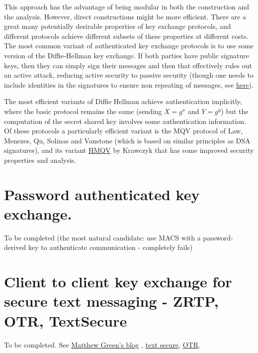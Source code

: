 This approach has the advantage of being modular in both the
construction and the analysis. However, direct constructions might be
more efficient. There are a great many potentially desirable properties
of key exchange protocols, and different protocols achieve different
subsets of these properties at different costs. The most common variant
of authenticated key exchange protocols is to use some version of the
Diffie-Hellman key exchange. If both parties have public signature keys,
then they can simply sign their messages and then that effectively rules
out an active attack, reducing active security to passive security
(though one needs to include identities in the signatures to ensure non
repeating of messages, see
\href{http://link.springer.com/article/10.1007\%2FBF00124891}{here}).

The most efficient variants of Diffie Hellman achieve authentication
implicitly, where the basic protocol remains the same (sending \(X=g^x\)
and \(Y=g^y\)) but the computation of the secret shared key involves
some authentication information. Of these protocols a particularly
efficient variant is the MQV protocol of Law, Menezes, Qu, Solinas and
Vanstone (which is based on similar principles as DSA signatures), and
its variant \href{https://eprint.iacr.org/2005/176.pdf}{HMQV} by
Krawczyk that has some improved security properties and analysis.

\section{Password authenticated key
exchange.}\label{Password-authenticated-ke}

To be completed (the most natural candidate: use MACS with a
password-derived key to authenticate communication - completely fails)


\section{Client to client key exchange for secure text messaging - ZRTP,
OTR, TextSecure}\label{Client-to-client-key-exch}

To be completed. See
\href{http://blog.cryptographyengineering.com/2013/03/here-come-encryption-apps.html}{Matthew
Green's blog} ,
\href{https://whispersystems.org/blog/advanced-ratcheting/}{text
secure}, \href{https://otr.cypherpunks.ca/Protocol-v3-4.0.0.html}{OTR}.

